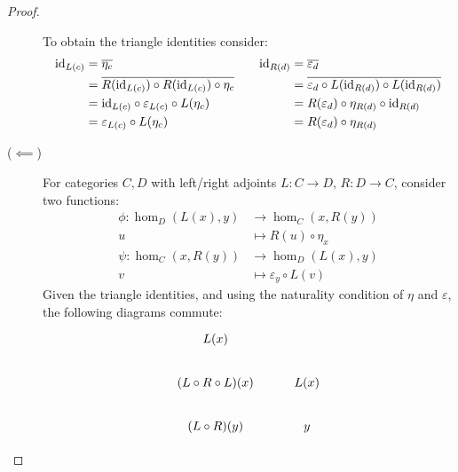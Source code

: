 \begin{theorem}
\begin{proof}
\begin{description}
        To obtain the triangle identities consider:
        \[
          \begin{aligned}
            \mathrm{id}_{L(c)} &= \overline{\eta_c}\\
              &= \overline{R(\mathrm{id}_{L(c)})\circ R(\mathrm{id}_{L(c)})\circ \eta_c}\\
              &= \mathrm{id}_{L(c)} \circ \varepsilon_{L(c)}\circ L(\eta_c)\\
              &= \varepsilon_{L(c)}\circ L(\eta_c)
          \end{aligned}
          \qquad
          \begin{aligned}
            \mathrm{id}_{R(d)} &= \overline{\varepsilon_d}\\
              &= \overline{\varepsilon_d
                \circ L(\mathrm{id}_{R(d)})\circ L(\mathrm{id}_{R(d)})}\\
              &= R(\varepsilon_d) \circ \eta_{R(d)} \circ \mathrm{id}_{R(d)}\\
              &= R(\varepsilon_d) \circ \eta_{R(d)}
          \end{aligned}
        \]
      \item[($\impliedby$)] For categories $C,D$ with left/right adjoints
        $L:C\to D$, $R:D\to C$, consider two functions:
        \[
          \begin{aligned}
            \phi: \hom_D(L(x), y) &\to \hom_C(x, R(y))\\
            u &\mapsto R(u)\circ \eta_x\\
            \psi: \hom_C(x, R(y)) &\to \hom_D(L(x), y)\\
            v &\mapsto \varepsilon_y \circ L(v)
          \end{aligned}
        \]
        Given the triangle identities, and using the naturality condition of $\eta$ and $\varepsilon$, the following diagrams commute:
        \[\begin{tikzcd}[ampersand replacement=\&]
          {L(x)} \\
          {(L\circ R\circ L)(x)} \& {L(x)} \\
          {(L\circ R)(y)} \& y

\end{tikzcd}\]
\end{description}
\end{proof}
\end{theorem}
